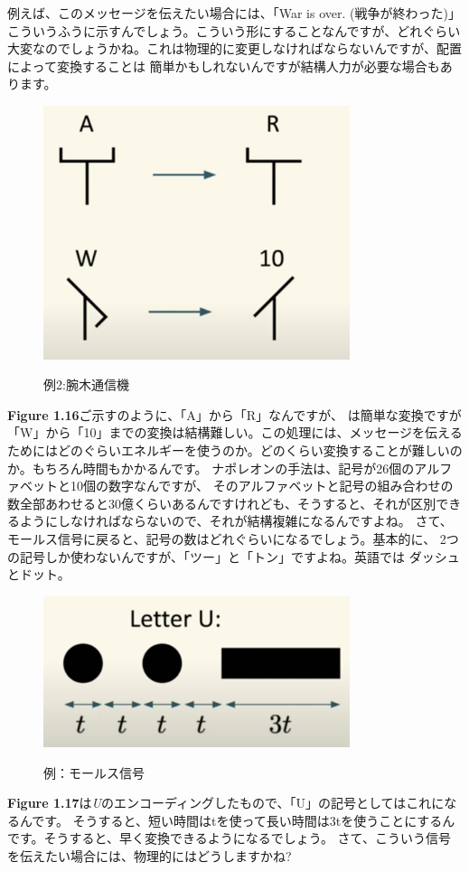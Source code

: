 例えば、このメッセージを伝えたい場合には、「War is over. (戦争が終わった)」こういうふうに示すんでしょう。こういう形にすることなんですが、どれぐらい大変なのでしょうかね。これは物理的に変更しなければならないんですが、配置によって変換することは
簡単かもしれないんですが結構人力が必要な場合もあります。
\begin{figure}[H]
    \centering
    \includegraphics[width=0.8\textwidth]{lesson1/a_to_r.pdf}
    \label{fig: 1}
    \begin{center}
        \caption{例2:腕木通信機}
    \end{center}
\end{figure}
\textbf{Figure 1.16}ご示すのように、「A」から「R」なんですが、
は簡単な変換ですが「W」から「10」までの変換は結構難しい。この処理には、メッセージを伝えるためにはどのぐらいエネルギーを使うのか。どのくらい変換することが難しいのか。もちろん時間もかかるんです。
ナポレオンの手法は、記号が26個のアルファベットと10個の数字なんですが、
そのアルファベットと記号の組み合わせの数全部あわせると30億くらいあるんですけれども、そうすると、それが区別できるようにしなければならないので、それが結構複雑になるんですよね。
さて、モールス信号に戻ると、記号の数はどれぐらいになるでしょう。基本的に、 2つの記号しか使わないんですが、「ツー」と「トン」ですよね。英語では
ダッシュとドット。
\begin{figure}[H]
    \centering
    \includegraphics[width=0.8\textwidth]{lesson1/letter_u.pdf}
    \label{fig: 1}
    \begin{center}
        \caption{例：モールス信号}
    \end{center}
\end{figure}
\textbf{Figure 1.17}は\emph{U}のエンコーディングしたもので、「U」の記号としてはこれになるんです。
そうすると、短い時間はtを使って長い時間は3tを使うことにするんです。そうすると、早く変換できるようになるでしょう。
さて、こういう信号を伝えたい場合には、物理的にはどうしますかね?
